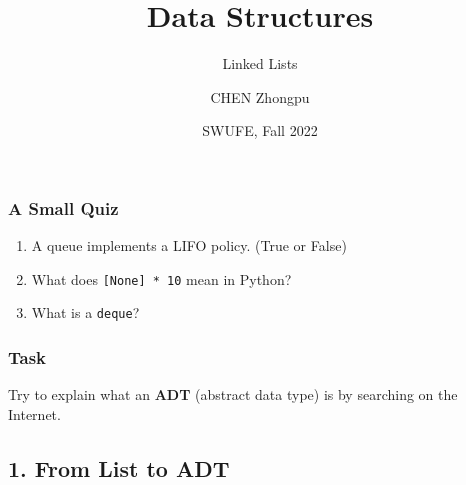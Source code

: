 \documentclass[aspectratio=169, 14pt]{beamer}
\title[Data Structures] %
{Data Structures}
\subtitle{Linked Lists}
\author[CHEN Zhongpu] %
{CHEN Zhongpu}
\institute[] %
{
  School of Computing and Artificial Intelligence \\
  \href{mailto:zpchen@swufe.edu.cn}{zpchen@swufe.edu.cn}
}
\date[] %
{SWUFE, Fall 2022}
\begin{document}
\frame{\titlepage}

\begin{frame}
\frametitle{A Small Quiz}
\begin{enumerate}
    \item A queue implements a LIFO policy. (True or False)
    \item What does \texttt{[None] * 10} mean in Python?
    \item What is a \texttt{deque}?
\end{enumerate}
\end{frame}

\begin{frame}
    \frametitle{Task}
Try to explain what an \textbf{ADT} (abstract data type) is by searching on the Internet.
    

\end{frame}

{
    \begin{frame}
        \section{\textcolor{darkmidnightblue}{1. From List to ADT}}
    \end{frame}

}
\end{document}
